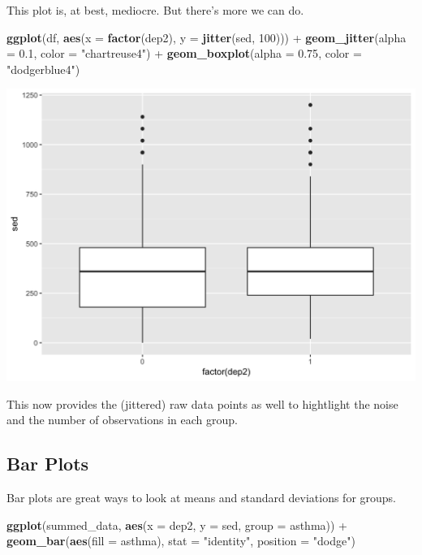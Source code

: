 \documentclass[]{tufte-book}
\newenvironment{Shaded}{}{}
\newcommand{\KeywordTok}[1]{\textcolor[rgb]{0.00,0.44,0.13}{\textbf{#1}}}
\newcommand{\DataTypeTok}[1]{\textcolor[rgb]{0.56,0.13,0.00}{#1}}
\newcommand{\DecValTok}[1]{\textcolor[rgb]{0.25,0.63,0.44}{#1}}
\newcommand{\FloatTok}[1]{\textcolor[rgb]{0.25,0.63,0.44}{#1}}
\newcommand{\StringTok}[1]{\textcolor[rgb]{0.25,0.44,0.63}{#1}}
\newcommand{\OperatorTok}[1]{\textcolor[rgb]{0.40,0.40,0.40}{#1}}
\newcommand{\NormalTok}[1]{#1}
\theoremstyle{definition}
\theoremstyle{definition}
\theoremstyle{remark}
\begin{document}
This plot is, at best, mediocre. But there's more we can do.

\begin{Shaded}
\begin{Highlighting}[]
\KeywordTok{ggplot}\NormalTok{(df, }\KeywordTok{aes}\NormalTok{(}\DataTypeTok{x =} \KeywordTok{factor}\NormalTok{(dep2), }\DataTypeTok{y =} \KeywordTok{jitter}\NormalTok{(sed, }
    \DecValTok{100}\NormalTok{))) }\OperatorTok{+}\StringTok{ }\KeywordTok{geom_jitter}\NormalTok{(}\DataTypeTok{alpha =} \FloatTok{0.1}\NormalTok{, }\DataTypeTok{color =} \StringTok{"chartreuse4"}\NormalTok{) }\OperatorTok{+}\StringTok{ }
\StringTok{    }\KeywordTok{geom_boxplot}\NormalTok{(}\DataTypeTok{alpha =} \FloatTok{0.75}\NormalTok{, }\DataTypeTok{color =} \StringTok{"dodgerblue4"}\NormalTok{)}
\end{Highlighting}
\end{Shaded}

\includegraphics{_main_files/figure-latex/unnamed-chunk-138-1}

This now provides the (jittered) raw data points as well to hightlight
the noise and the number of observations in each group.

\subsection*{Bar Plots}\label{bar-plots}

Bar plots are great ways to look at means and standard deviations for
groups.

\begin{Shaded}
\begin{Highlighting}[]
\KeywordTok{ggplot}\NormalTok{(summed_data, }\KeywordTok{aes}\NormalTok{(}\DataTypeTok{x =}\NormalTok{ dep2, }\DataTypeTok{y =}\NormalTok{ sed, }\DataTypeTok{group =}\NormalTok{ asthma)) }\OperatorTok{+}\StringTok{ }
\StringTok{    }\KeywordTok{geom_bar}\NormalTok{(}\KeywordTok{aes}\NormalTok{(}\DataTypeTok{fill =}\NormalTok{ asthma), }\DataTypeTok{stat =} \StringTok{"identity"}\NormalTok{, }
        \DataTypeTok{position =} \StringTok{"dodge"}\NormalTok{)}
\end{Highlighting}
\end{Shaded}
\end{document}
